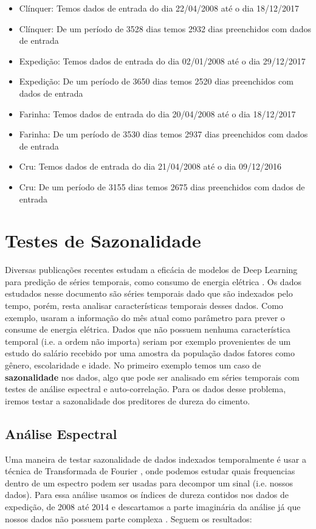 \begin{itemize}
\item Clínquer: Temos dados de entrada do dia 22/04/2008 até o dia 18/12/2017
\item Clínquer: De um período de 3528 dias temos 2932 dias preenchidos com dados de entrada
\item Expedição: Temos dados de entrada do dia 02/01/2008 até o dia 29/12/2017
\item Expedição: De um período de 3650 dias temos 2520 dias preenchidos com dados de entrada
\item Farinha: Temos dados de entrada do dia 20/04/2008 até o dia 18/12/2017
\item Farinha: De um período de 3530 dias temos 2937 dias preenchidos com dados de entrada
\item Cru: Temos dados de entrada do dia 21/04/2008 até o dia 09/12/2016
\item Cru: De um período de 3155 dias temos 2675 dias preenchidos com dados de entrada
\end{itemize}


\section{Testes de Sazonalidade}

Diversas publicações recentes estudam a eficácia de modelos de Deep Learning
para predição de séries temporais, como consumo de energia elétrica
\citep{lstmbr}. Os dados estudados nesse documento são séries temporais dado que
são indexados pelo tempo, porém, resta analisar características temporais desses
dados. Como exemplo, \cite{lstmbr} usaram a informação do mês atual como
parâmetro para prever o consume de energia elétrica. Dados que não possuem nenhuma característica temporal (i.e. a ordem não importa) seriam por exemplo provenientes de um estudo do salário recebido por uma amostra da população dados fatores como gênero, escolaridade e idade. No primeiro exemplo temos um caso de \textbf{sazonalidade} nos dados, algo que pode ser analisado em séries temporais com testes de análise espectral e auto-correlação. Para os dados desse problema, iremos testar a sazonalidade dos preditores de dureza do cimento.

\subsection{Análise Espectral}

Uma maneira de testar sazonalidade de dados indexados temporalmente é usar a
técnica de Transformada de Fourier \citep{spec}, onde podemos estudar quais
frequencias dentro de um espectro podem ser usadas para decompor um sinal (i.e.
nossos dados). Para essa análise usamos os índices de dureza contidos nos dados
de expedição, de 2008 até 2014 e descartamos a parte imaginária da análise já
que nossos dados não possuem parte complexa \citep{spec}. Seguem os resultados:

